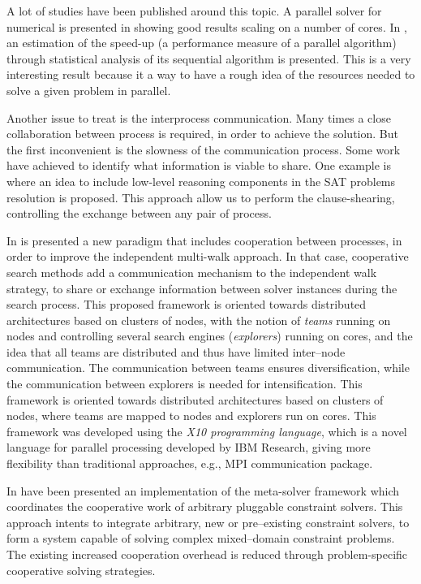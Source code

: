 A lot of studies have been published around this topic. A parallel solver for numerical \csps{} is presented in \cite{Ishii2014} showing good results scaling on a number of cores. In \cite{Truchet02}, an estimation of the speed-up (a performance measure of a parallel algorithm) through statistical analysis of its sequential algorithm is presented. This is a very interesting result because it a way to have a rough idea of the resources needed to solve a given problem in parallel.

Another issue to treat is the interprocess communication. Many times a close collaboration between process is required, in order to achieve the solution. But the first inconvenient is the slowness of the communication process. Some work have achieved to identify what information is viable to share. One example is \cite{Hamadi2012} where an idea to include low-level reasoning components in the SAT problems resolution is proposed. This approach allow us to perform the clause-shearing, controlling the exchange between any pair of process.

In \cite{Munera} is presented a new paradigm that includes cooperation between processes, in order to improve the independent multi-walk approach. In that case, cooperative search methods add a communication mechanism to the independent walk strategy, to share or exchange information between solver instances during the search process. This proposed framework is oriented towards distributed architectures based on clusters of nodes, with the notion of {\it teams} running on nodes and controlling several search engines ({\it explorers}) running on cores, and the idea that all teams are distributed and thus have limited inter--node communication. The communication between teams ensures diversification, while the communication between explorers is needed for intensification. This framework is oriented towards distributed architectures based on clusters of nodes, where teams are mapped to nodes and explorers run on cores. This framework was developed using the {\it X10 programming language}, which is a novel language for parallel processing developed by IBM Research, giving more flexibility than traditional approaches, e.g., MPI communication package.

In \cite{Frank2003} have been presented an implementation of the meta-solver framework which coordinates the cooperative work of arbitrary pluggable constraint solvers. This approach intents to integrate arbitrary, new or pre--existing constraint solvers, to form a system capable of solving complex mixed--domain constraint problems. The existing increased cooperation overhead is reduced through problem-specific cooperative solving strategies.

